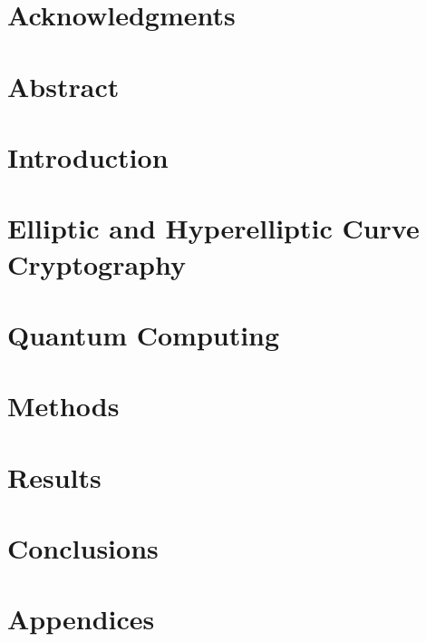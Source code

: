 \documentclass[10pt]{article}
\begin{document}

\restoregeometry

\section{Acknowledgments}

\pagebreak

\setcounter{tocdepth}{5}
\tableofcontents
\pagebreak

\listoffigures
\listoftables
\pagebreak

\justify

\section*{Abstract}

\pagebreak

\section{Introduction}


\section{Elliptic and Hyperelliptic Curve Cryptography}


\section{Quantum Computing}


\section{Methods}


\section{Results}


\section{Conclusions}


\pagebreak
\section{Appendices}


\pagebreak


\end{document}
